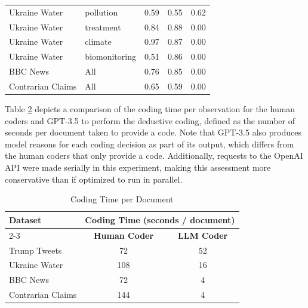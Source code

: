 \documentclass{article}
\begin{document}
\begin{table}[!htb]
\begin{tabular}{@{}llccc@{}}
Ukraine Water     & pollution     & 0.59 & 0.55 & 0.62 \\[0.5mm] 
Ukraine Water     & treatment     & 0.84 & 0.88 & 0.00 \\[0.5mm] 
Ukraine Water     & climate       & 0.97 & 0.87 & 0.00 \\[0.5mm] 
Ukraine Water     & biomonitoring & 0.51 & 0.86 & 0.00 \\[0.5mm] 
BBC News          & All           & 0.76 & 0.85 & 0.00 \\[0.5mm] 
Contrarian Claims & All           & 0.65 & 0.59 & 0.00 \\ \bottomrule
\end{tabular}
\label{tab:tab7}
\end{table}

Table \ref{tab:tab8} depicts a comparison of the coding time per observation for the human coders and GPT-3.5 to perform the deductive coding, defined as the number of seconds per document taken to provide a code.  Note that GPT-3.5 also produces model reasons for each coding decision as part of its output, which differs from the human coders that only provide a code.  Additionally, requests to the OpenAI API were made serially in this experiment, making this assessment more conservative than if optimized to run in parallel.

\begin{table}[htb!]
\caption{Coding Time per Document}
\vspace*{2.5mm}
\begin{tabular}{@{}lcc@{}}
\toprule
\multirow{2}{*}{\textbf{Dataset}} & \multicolumn{2}{c}{\textbf{Coding Time (seconds / document)}} \\ \cmidrule(l){2-3} 
                         & \textbf{Human Coder}                & \textbf{LLM Coder}               \\ \midrule
Trump Tweets             & 72                         & 52                      \\[0.5mm]
Ukraine Water            & 108                        & 16                      \\[0.5mm]
BBC News                 & 72                         & 4                       \\[0.5mm]
Contrarian Claims        & 144                        & 4                       \\ \bottomrule
\end{tabular}
\label{tab:tab8}
\end{table}
\end{document}

